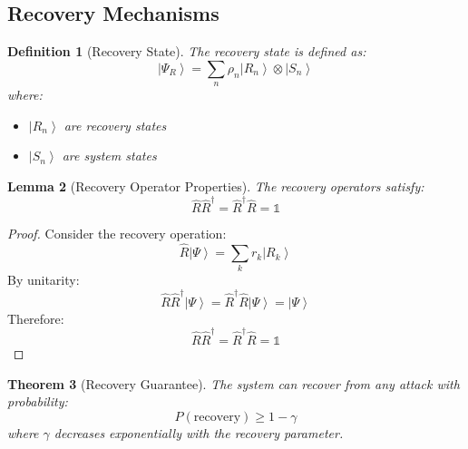 \documentclass[12pt]{article}
\newcommand{\ket}[1]{\left|#1\right\rangle}
\newcommand{\op}[1]{\hat{#1}}
\newtheorem{theorem}{Theorem}[section]
\newtheorem{lemma}[theorem]{Lemma}
\newtheorem{definition}[theorem]{Definition}
\begin{document}
\subsection{Recovery Mechanisms}
\begin{definition}[Recovery State]
The recovery state is defined as:
\begin{equation}
\ket{\Psi_R} = \sum_n \rho_n\ket{R_n} \otimes \ket{S_n}
\end{equation}
where:
\begin{itemize}
\item $\ket{R_n}$ are recovery states
\item $\ket{S_n}$ are system states
\end{itemize}
\end{definition}
\begin{lemma}[Recovery Operator Properties]
The recovery operators satisfy:
\begin{equation}
\op{R}\op{R}^\dagger = \op{R}^\dagger\op{R} = \mathbb{1}
\end{equation}
\end{lemma}
\begin{proof}
Consider the recovery operation:
\begin{equation}
\op{R}\ket{\Psi} = \sum_k r_k\ket{R_k}
\end{equation}
By unitarity:
\begin{equation}
\op{R}\op{R}^\dagger\ket{\Psi} = \op{R}^\dagger\op{R}\ket{\Psi} = \ket{\Psi}
\end{equation}
Therefore:
\begin{equation}
\op{R}\op{R}^\dagger = \op{R}^\dagger\op{R} = \mathbb{1}
\end{equation}
\end{proof}
\begin{theorem}[Recovery Guarantee]
The system can recover from any attack with probability:
\begin{equation}
P(\text{recovery}) \geq 1 - \gamma
\end{equation}
where $\gamma$ decreases exponentially with the recovery parameter.
\end{theorem}
\end{document}
